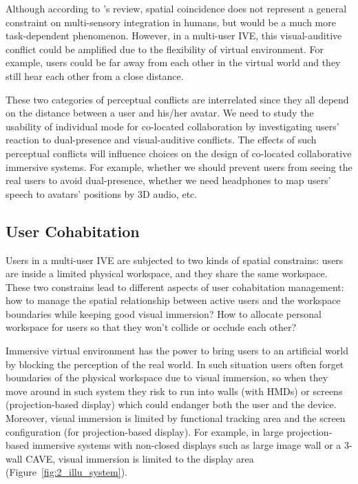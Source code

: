 Although according to \citet{Spence2013Just}'s review, spatial coincidence does not represent a general constraint on multi-sensory integration in humans, but would be a much more task-dependent phenomenon. However, in a multi-user IVE, this visual-auditive conflict could be amplified due to the flexibility of virtual environment. For example, users could be far away from each other in the virtual world and they still hear each other from a close distance.

These two categories of perceptual conflicts are interrelated since they all depend on the distance between a user and his/her avatar. We need to study the usability of individual mode for co-located collaboration by investigating users' reaction to dual-presence and visual-auditive conflicts. The effects of such perceptual conflicts will influence choices on the design of co-located collaborative immersive systems. For example, whether we should prevent users from seeing the real users to avoid dual-presence, whether we need headphones to map users' speech to avatars' positions by 3D audio, etc.


\subsection{User Cohabitation}
Users in a multi-user IVE are subjected to two kinds of spatial constrains: users are inside a limited physical workspace, and they share the same workspace. These two constrains lead to different aspects of user cohabitation management: how to manage the spatial relationship between active users and the workspace boundaries while keeping good visual immersion? How to allocate personal workspace for users so that they won't collide or occlude each other?

Immersive virtual environment has the power to bring users to an artificial world by blocking the perception of the real world. In such situation users often forget boundaries of the physical workspace due to visual immersion, so when they move around in such system they risk to run into walls (with HMDs) or screens (projection-based display) which could endanger both the user and the device. Moreover, visual immersion is limited by functional tracking area and the screen configuration (for projection-based display). For example, in large projection-based immersive systems with non-closed displays such as large image wall or a 3-wall CAVE, visual immersion is limited to the display area (Figure~\ref{fig:2_illu_system}).

